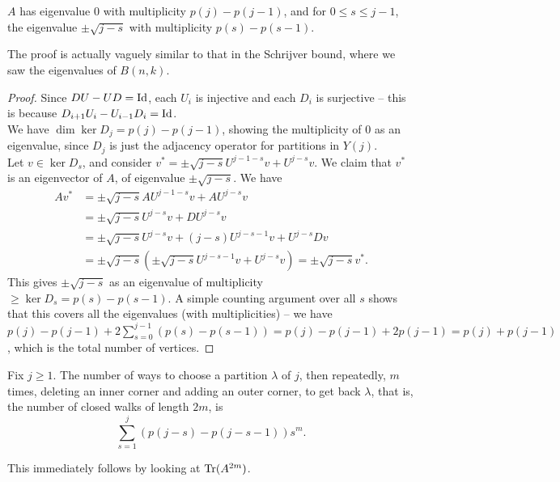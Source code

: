 \begin{ftheo}
	$A$ has eigenvalue $0$ with multiplicity $p(j) - p(j-1)$, and for $0 \le s \le j-1$, the eigenvalue $\pm \sqrt{j-s}$ with multiplicity $p(s)-p(s-1)$.
\end{ftheo}
The proof is actually vaguely similar to that in the Schrijver bound, where we saw the eigenvalues of $B(n,k)$.
\begin{proof}
	Since $DU-UD = \operatorname{Id}$, each $U_i$ is injective and each $D_i$ is surjective -- this is because $D_{i+1} U_i - U_{i-1} D_i = \operatorname{Id}$.\\
	We have $\dim \ker D_j = p(j) - p(j-1)$, showing the multiplicity of $0$ as an eigenvalue, since $D_j$ is just the adjacency operator for partitions in $Y(j)$.\\
	Let $v \in \ker D_s$, and consider $v^* = \pm \sqrt{j-s} U^{j-1-s}v + U^{j-s}v$. We claim that $v^*$ is an eigenvector of $A$, of eigenvalue $\pm\sqrt{j-s}$. We have
	\begin{align*}
		Av^* &= \pm\sqrt{j-s}AU^{j-1-s}v + AU^{j-s}v \\
			&= \pm\sqrt{j-s}U^{j-s}v + DU^{j-s}v \\
			&= \pm \sqrt{j-s}U^{j-s}v + (j-s)U^{j-s-1}v + U^{j-s}Dv \\
			&= \pm\sqrt{j-s}\left( \pm\sqrt{j-s}U^{j-s-1}v + U^{j-s}v \right) = \pm\sqrt{j-s}v^*.
	\end{align*}
	This gives $\pm \sqrt{j-s}$ as an eigenvalue of multiplicity $\ge \ker D_s = p(s) - p(s-1)$. A simple counting argument over all $s$ shows that this covers all the eigenvalues (with multiplicities) -- we have $p(j) - p(j-1) + 2\sum_{s=0}^{j-1} (p(s) - p(s-1)) = p(j) - p(j-1) + 2p(j-1) = p(j) + p(j-1)$, which is the total number of vertices.
\end{proof}

\begin{fcor}
	Fix $j \ge 1$. The number of ways to choose a partition $\lambda$ of $j$, then repeatedly, $m$ times, deleting an inner corner and adding an outer corner, to get back $\lambda$, that is, the number of closed walks of length $2m$, is 
	\[ \sum_{s=1}^{j} (p(j-s) - p(j-s-1)) s^m. \]
\end{fcor}
This immediately follows by looking at $\operatorname{Tr}(A^{2m})$.